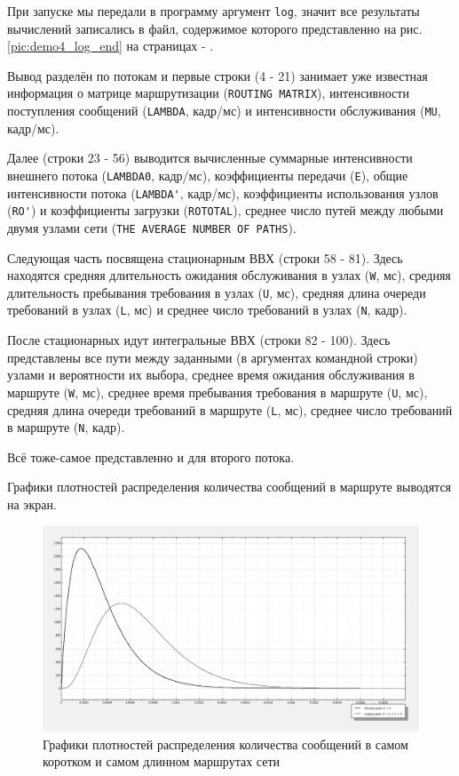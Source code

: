 \documentclass[oneside, draft, 14pt, a4paper]{extreport}
\begin{document}
При запуске мы передали в программу аргумент \verb:log:, значит все результаты вычислений записались в файл, содержимое которого представленно на рис. \ref{pic:demo4_log_end} на страницах \pageref{pic:demo4_log_begin} - \pageref{pic:demo4_log_end}.

Вывод разделён по потокам и первые строки (4 - 21) занимает уже известная информация о матрице маршрутизации (\verb:ROUTING MATRIX:), интенсивности поступления сообщений (\verb:LAMBDA:, кадр/мс) и интенсивности обслуживания (\verb:MU:, кадр/мс).

Далее (строки 23 - 56) выводится вычисленные суммарные интенсивности внешнего потока (\verb:LAMBDA0:, кадр/мс), коэффициенты передачи (\verb:E:), общие интенсивности потока (\verb:LAMBDA':, кадр/мс), коэффициенты использования узлов (\verb:RO':) и коэффициенты загрузки (\verb:ROTOTAL:), среднее число путей между любыми двумя узлами сети  (\verb:THE AVERAGE NUMBER OF PATHS:).

Следующая часть посвящена стационарным ВВХ (строки 58 - 81). Здесь находятся средняя длительность ожидания обслуживания в узлах (\verb:W:, мс), средняя длительность пребывания требования в узлах (\verb:U:, мс), средняя длина очереди требований в узлах (\verb:L:, мс) и среднее число требований в узлах (\verb:N:, кадр).

После стационарных идут интегральные ВВХ (строки 82 - 100). Здесь представлены все пути между заданными (в аргументах командной строки) узлами и вероятности их выбора, среднее время ожидания обслуживания в маршруте (\verb:W:, мс), среднее время пребывания требования в маршруте (\verb:U:, мс), средняя длина очереди требований в маршруте (\verb:L:, мс), среднее число требований в маршруте (\verb:N:, кадр).

Всё тоже-самое представленно и для второго потока.

Графики плотностей распределения количества сообщений в маршруте выводятся на экран.

\begin{figure}[h!]
	\centering
	\includegraphics[width=\textwidth]{demo4_chart}
	
	\caption{Графики плотностей распределения количества сообщений в самом коротком и самом длинном маршрутах сети}
	\label{pic:demo4_graph}
\end{figure}
\end{document}
